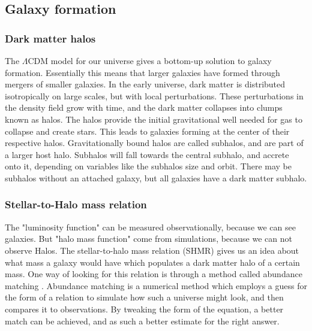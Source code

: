 \subsection{Galaxy formation}

\subsubsection{Dark matter halos}

The $\Lambda$CDM model for our universe gives a bottom-up solution to galaxy formation. Essentially this means that larger galaxies have formed through mergers of smaller galaxies. In the early universe, dark matter is distributed isotropically on large scales, but with local perturbations. These perturbations in the density field grow with time, and the dark matter collapses into clumps known as halos. The halos provide the initial gravitational well needed for gas to collapse and create stars. This leads to galaxies forming at the center of their respective halos. Gravitationally bound halos are called subhalos, and are part of a larger host halo. Subhalos will fall towards the central subhalo, and accrete onto it, depending on variables like the subhalos size and orbit. There may be subhalos without an attached galaxy, but all galaxies have a dark matter subhalo.


\subsubsection{Stellar-to-Halo mass relation}

The "luminosity function" can be measured observationally, because we can see galaxies. But "halo mass function" come from simulations, because we can not observe Halos.
The stellar-to-halo mass relation (SHMR) gives us an idea about what mass a galaxy would have which populates a dark matter halo of a certain mass. One way of looking for this relation is through a method called abundance matching \parencite{None2000}. Abundance matching is a numerical method which employs a guess for the form of a relation to simulate how such a universe might look, and then compares it to observations. By tweaking the form of the equation, a better match can be achieved, and as such a better estimate for the right answer. 

